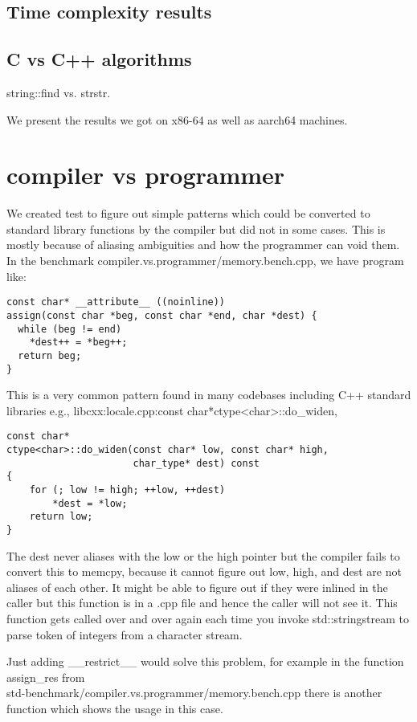 \documentclass{sig-alternate}
\begin{document}
\subsection{Time complexity results}

\subsection{C vs C++ algorithms}
string::find vs. strstr.

We present the results we got on x86-64 as well as aarch64 machines.

\section{compiler vs programmer}
We created test to figure out simple patterns which could be converted to
standard library functions by the compiler but did not in some cases. This is mostly
because of aliasing ambiguities and how the programmer can void them.
In the benchmark compiler.vs.programmer/memory.bench.cpp, we have program like:

\begin{verbatim}
const char* __attribute__ ((noinline))
assign(const char *beg, const char *end, char *dest) {
  while (beg != end)
    *dest++ = *beg++;
  return beg;
}
\end{verbatim}

This is a very common pattern found in many codebases including C++ standard libraries e.g.,
libcxx:locale.cpp:const char*ctype<char>::do\_widen,

\begin{verbatim}
const char*
ctype<char>::do_widen(const char* low, const char* high,
                      char_type* dest) const
{
    for (; low != high; ++low, ++dest)
        *dest = *low;
    return low;
}
\end{verbatim}

The dest never aliases with the low or the high pointer but the compiler fails to convert
this to memcpy, because it cannot figure out low, high, and dest are not aliases of each other.
It might be able to figure out if they were inlined in the caller but this function is in a .cpp
file and hence the caller will not see it. This function gets called over and over again
each time you invoke std::stringstream to parse token of integers from a character stream.

Just adding \_\_restrict\_\_ would solve this problem, for example in the function assign\_res from\\
std-benchmark/compiler.vs.programmer/memory.bench.cpp there is another function which shows the
usage in this case.
\end{document}
